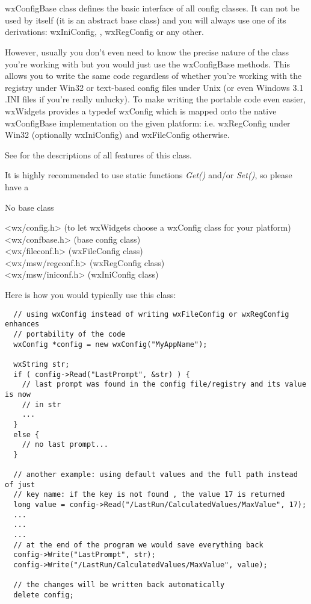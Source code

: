 \section{}\label{wxconfigbase}

wxConfigBase class defines the basic interface of all config classes. It can
not be used by itself (it is an abstract base class) and you will always use one
of its derivations: wxIniConfig, ,
wxRegConfig or any other.

However, usually you don't even need to know the precise nature of the class
you're working with but you would just use the wxConfigBase methods. This
allows you to write the same code regardless of whether you're working with
the registry under Win32 or text-based config files under Unix (or even
Windows 3.1 .INI files if you're really unlucky). To make writing the portable
code even easier, wxWidgets provides a typedef wxConfig
which is mapped onto the native wxConfigBase implementation on the given
platform: i.e. wxRegConfig under Win32 (optionally wxIniConfig) and
wxFileConfig otherwise.

See  for the descriptions of all
features of this class.

It is highly recommended to use static functions {\it Get()} and/or {\it Set()}, 
so please have a 


No base class


<wx/config.h> (to let wxWidgets choose a wxConfig class for your platform)\\
<wx/confbase.h> (base config class)\\
<wx/fileconf.h> (wxFileConfig class)\\
<wx/msw/regconf.h> (wxRegConfig class)\\
<wx/msw/iniconf.h> (wxIniConfig class)


Here is how you would typically use this class:

\begin{verbatim}
  // using wxConfig instead of writing wxFileConfig or wxRegConfig enhances
  // portability of the code
  wxConfig *config = new wxConfig("MyAppName");

  wxString str;
  if ( config->Read("LastPrompt", &str) ) {
    // last prompt was found in the config file/registry and its value is now
    // in str
    ...
  }
  else {
    // no last prompt...
  }

  // another example: using default values and the full path instead of just
  // key name: if the key is not found , the value 17 is returned
  long value = config->Read("/LastRun/CalculatedValues/MaxValue", 17);
  ...
  ...
  ...
  // at the end of the program we would save everything back
  config->Write("LastPrompt", str);
  config->Write("/LastRun/CalculatedValues/MaxValue", value);

  // the changes will be written back automatically
  delete config;
\end{verbatim}

